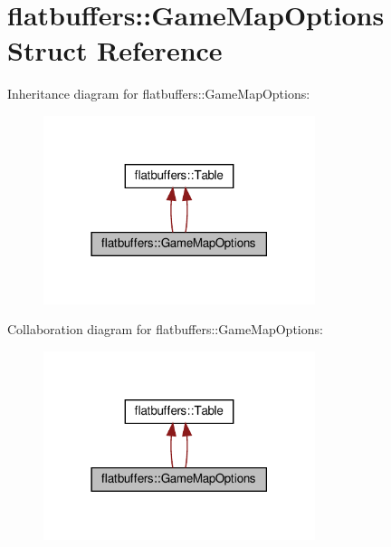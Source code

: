 \hypertarget{structflatbuffers_1_1GameMapOptions}{}\section{flatbuffers\+:\+:Game\+Map\+Options Struct Reference}
\label{structflatbuffers_1_1GameMapOptions}


Inheritance diagram for flatbuffers\+:\+:Game\+Map\+Options\+:
\nopagebreak
\begin{figure}[H]
\begin{center}
\leavevmode
\includegraphics[width=225pt]{structflatbuffers_1_1GameMapOptions__inherit__graph}
\end{center}
\end{figure}


Collaboration diagram for flatbuffers\+:\+:Game\+Map\+Options\+:
\nopagebreak
\begin{figure}[H]
\begin{center}
\leavevmode
\includegraphics[width=225pt]{structflatbuffers_1_1GameMapOptions__coll__graph}
\end{center}
\end{figure}
